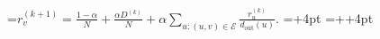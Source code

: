 \documentclass[11pt]{article}
\begin{document}
=\hbox{$\displaystyle r_v^{(k+1)}=\frac{1-\alpha}{N}+\frac{\alpha D^{(k)}}{N}+\alpha\sum_{u:(u,v)\in\mathcal{E}}\frac{r_u^{(k)}}{d_{\mathrm{out}}(u)}.$}
\pdfpagewidth=\dimexpr{}+4pt\relax
\pdfpageheight=\dimexpr{}++4pt\relax
\hoffset=-1in
\voffset=-1in
\shipout\vbox{\kern2pt\hbox{\kern2pt\kern2pt}\kern2pt}
\end{document}
